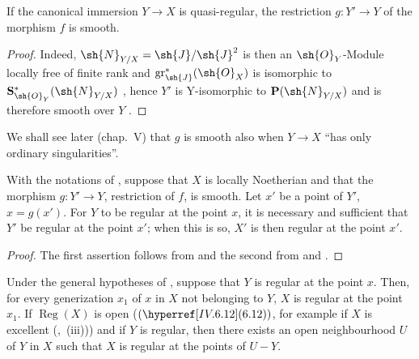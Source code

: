 \begin{corollary}[19.4.3]
\label{IV.19.4.3}
If the canonical immersion $Y\to X$ is quasi-regular, the restriction $g:Y'\to Y$ of the morphism $f$ is smooth.
\end{corollary}

\begin{proof}
Indeed, $\sh{N}_{Y/X}=\sh{J}/\sh{J}^2$ is then an $\sh{O}_Y$-Module locally free of finite rank and $\operatorname{gr}_\sh{J}^*(\sh{O}_X)$ is isomorphic to $\mathbf{S}_{\sh{O}_Y}^*(\sh{N}_{Y/X})$ , hence $Y'$ is Y-isomorphic to $\mathbf{P}(\sh{N}_{Y/X})$ and is therefore smooth over $Y$ .
\end{proof}

We shall see later (chap.~V) that $g$ is smooth also when $Y\to X$ ``has only ordinary singularities''.

\begin{proposition}[19.4.4]
\label{IV.19.4.4}
With the notations of , suppose that $X$ is locally Noetherian and that the morphism $g:Y'\to Y$, restriction of $f$, is smooth.
Let $x'$ be a point of $Y'$, $x=g(x')$.
For $Y$ to be regular at the point $x$, it is necessary and sufficient that $Y'$ be regular at the point $x'$; when this is so, $X'$ is then regular at the point $x'$.
\end{proposition}

\begin{proof}
The first assertion follows from  and the second from  and .
\end{proof}

\begin{corollary}[19.4.5]
\label{IV.19.4.5}
Under the general hypotheses of , suppose that $Y$ is regular at the point $x$.
Then, for every generization $x_1$ of $x$ in $X$ not belonging to $Y$, $X$ is regular at the point $x_1$.
If $\operatorname{Reg}(X)$ is open ($(\sref{IV.6.12})$, for example if $X$ is excellent (,~(iii)))
and if $Y$ is regular, then there exists an open neighbourhood $U$ of $Y$ in $X$ such that $X$ is regular at the points of $U-Y$.
\end{corollary}

